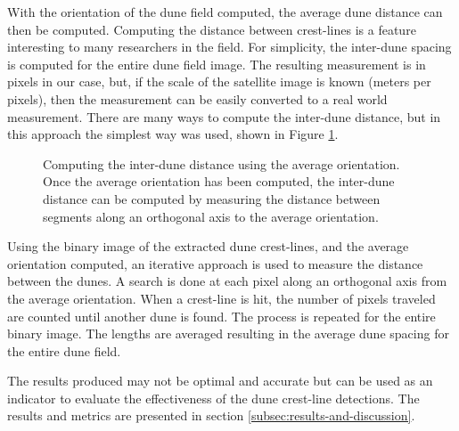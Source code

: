 With the orientation of the dune field computed, the average dune distance can then be computed. Computing the distance between crest-lines is a feature interesting to many researchers in the field. For simplicity, the inter-dune spacing is computed for the entire dune field image. The resulting measurement is in pixels in our case, but, if the scale of the satellite image is known (meters per pixels), then the measurement can be easily converted to a real world measurement. There are many ways to compute the inter-dune distance, but in this approach the simplest way was used, shown in Figure \ref{fig:inter-dune-distance-computation}. 

\begin{figure}
	\centering
	\caption{ Computing the inter-dune distance using the average orientation. Once the average orientation has been computed, the inter-dune distance can be computed by measuring the distance between segments along an orthogonal axis to the average orientation.}
	\label{fig:inter-dune-distance-computation}
\end{figure}

Using the binary image of the extracted dune crest-lines, and the average orientation computed, an iterative approach is used to measure the distance between the dunes. A search is done at each pixel along an orthogonal axis from the average orientation. When a crest-line is hit, the number of pixels traveled are counted until another dune is found. The process is repeated for the entire binary image. The lengths are averaged resulting in the average dune spacing for the entire dune field.

The results produced may not be optimal and accurate but can be used as an indicator to evaluate the effectiveness of the dune crest-line detections. The results and metrics are presented in section \ref{subsec:results-and-discussion}.











